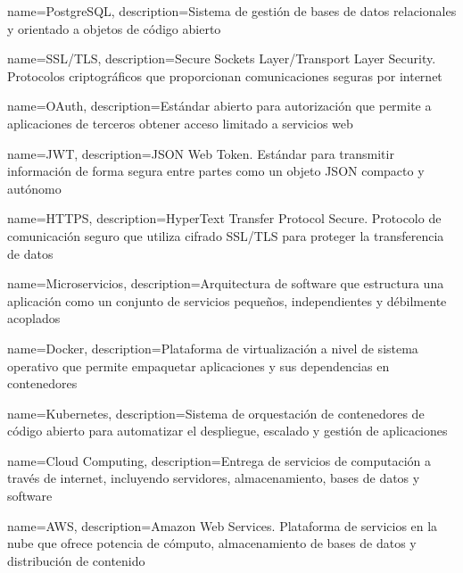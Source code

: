 {
    name={PostgreSQL},
    description={Sistema de gestión de bases de datos relacionales y orientado a objetos de código abierto}
}


{
    name={SSL/TLS},
    description={Secure Sockets Layer/Transport Layer Security. Protocolos criptográficos que proporcionan comunicaciones seguras por internet}
}

{
    name={OAuth},
    description={Estándar abierto para autorización que permite a aplicaciones de terceros obtener acceso limitado a servicios web}
}

{
    name={JWT},
    description={JSON Web Token. Estándar para transmitir información de forma segura entre partes como un objeto JSON compacto y autónomo}
}

{
    name={HTTPS},
    description={HyperText Transfer Protocol Secure. Protocolo de comunicación seguro que utiliza cifrado SSL/TLS para proteger la transferencia de datos}
}


{
    name={Microservicios},
    description={Arquitectura de software que estructura una aplicación como un conjunto de servicios pequeños, independientes y débilmente acoplados}
}

{
    name={Docker},
    description={Plataforma de virtualización a nivel de sistema operativo que permite empaquetar aplicaciones y sus dependencias en contenedores}
}

{
    name={Kubernetes},
    description={Sistema de orquestación de contenedores de código abierto para automatizar el despliegue, escalado y gestión de aplicaciones}
}

{
    name={Cloud Computing},
    description={Entrega de servicios de computación a través de internet, incluyendo servidores, almacenamiento, bases de datos y software}
}

{
    name={AWS},
    description={Amazon Web Services. Plataforma de servicios en la nube que ofrece potencia de cómputo, almacenamiento de bases de datos y distribución de contenido}
}

